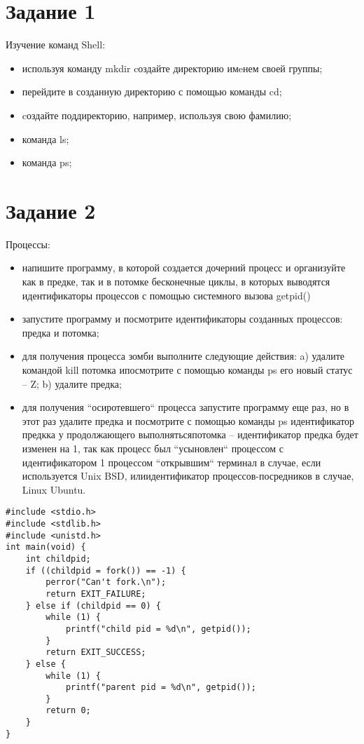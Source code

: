 \chapter*{Задание 1}

Изучение команд {\ttfamily Shell}:
\begin{itemize}
	\item используя команду {\ttfamily mkdir} cоздайте директорию имeнем своей группы;
	\item перейдите в созданную директорию с помощью команды {\ttfamily cd};
	\item cоздайте поддиректорию, например, используя свою фамилию;
	\item команда {\ttfamily ls};
	\item команда {\ttfamily ps};
\end{itemize}



\chapter*{Задание 2}

Процессы:
\begin{itemize}
	\item напишите программу, в которой создается дочерний процесс и организуйте как в предке, так и в потомке бесконечные циклы, в которых выводятся идентификаторы процессов с помощью системного вызова {\ttfamily getpid()}
	\item запустите программу и посмотрите идентификаторы созданных процессов: предка и потомка;
	\item для получения процесса зомби выполните следующие действия: a) удалите командой {\ttfamily kill} потомка ипосмотрите с помощью команды {\ttfamily ps} его новый статус – Z; b) удалите предка;
	\item для получения ``осиротевшего`` процесса запустите программу еще раз, но в этот раз удалите предка и посмотрите с помощью команды ps идентификатор предкка у продолжающего выполнятьсяпотомка -- идентификатор предка будет изменен на 1, так как процесс был ``усыновлен`` процессом с идентификатором 1 процессом ``открывшим`` терминал в случае, если используется {\ttfamily Unix BSD}, илиидентификатор процессов-посредников в случае, {\ttfamily Linux Ubuntu}.
\end{itemize}

\begin{lstlisting}[style=CStyle]
#include <stdio.h>
#include <stdlib.h>
#include <unistd.h>
int main(void) {
	int childpid;
	if ((childpid = fork()) == -1) {
		perror("Can't fork.\n");
		return EXIT_FAILURE;
	} else if (childpid == 0) {
		while (1) {
			printf("child pid = %d\n", getpid());
		}
		return EXIT_SUCCESS;
	} else {
		while (1) {
			printf("parent pid = %d\n", getpid());
		}
		return 0;
	}
}
\end{lstlisting}

